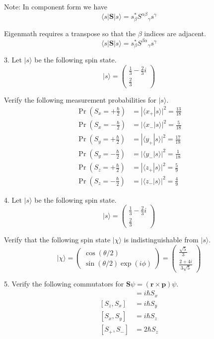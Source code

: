 Note: In component form we have
\begin{equation*}
\langle s|\mathbf S|s\rangle
=s_\beta^*{S^{\alpha\beta}}_\gamma s^\gamma
\end{equation*}

Eigenmath requires a transpose so that the $\beta$ indices are adjacent.
\begin{equation*}
\langle s|\mathbf S|s\rangle
=s_\beta^*{S^{\beta\alpha}}_\gamma s^\gamma
\end{equation*}

3. Let $|s\rangle$ be the following spin state.
\begin{equation*}
|s\rangle=\begin{pmatrix}\frac{1}{3}-\frac{2}{3}i\\[1ex]\frac{2}{3}\end{pmatrix}
\end{equation*}

Verify the following measurement probabilities for $|s\rangle$.
\begin{align*}
\Pr\left(S_x=+\tfrac{\hbar}{2}\right)&=|\langle x_+|s\rangle|^2=\tfrac{13}{18}
\\
\Pr\left(S_x=-\tfrac{\hbar}{2}\right)&=|\langle x_-|s\rangle|^2=\tfrac{5}{18}
\\[1ex]
\Pr\left(S_y=+\tfrac{\hbar}{2}\right)&=|\langle y_+|s\rangle|^2=\tfrac{17}{18}
\\
\Pr\left(S_y=-\tfrac{\hbar}{2}\right)&=|\langle y_-|s\rangle|^2=\tfrac{1}{18}
\\[1ex]
\Pr\left(S_z=+\tfrac{\hbar}{2}\right)&=|\langle z_+|s\rangle|^2=\tfrac{5}{9}
\\
\Pr\left(S_z=-\tfrac{\hbar}{2}\right)&=|\langle z_-|s\rangle|^2=\tfrac{4}{9}
\end{align*}

4. Let $|s\rangle$ be the following spin state.
\begin{equation*}
|s\rangle=\begin{pmatrix}\frac{1}{3}-\frac{2}{3}i\\[1ex]\frac{2}{3}\end{pmatrix}
\end{equation*}

Verify that the following spin state $|\chi\rangle$ is indistinguishable from $|s\rangle$.
\begin{equation*}
|\chi\rangle
=\begin{pmatrix}\cos(\theta/2)\\\sin(\theta/2)\exp(i\phi)\end{pmatrix}
=\begin{pmatrix}\frac{\sqrt5}{3}\\[1ex]\frac{2+4i}{3\sqrt5}\end{pmatrix}
\end{equation*}

5. Verify the following commutators for
$\mathbf S\psi=(\mathbf r\times\mathbf p)\psi$.
\begin{align*}
[S_y,S_z]&=i\hbar S_x
\\
[S_z,S_x]&=i\hbar S_y
\\
[S_x,S_y]&=i\hbar S_z
\\[1ex]
[S_+,S_-]&=2\hbar S_z
\end{align*}


